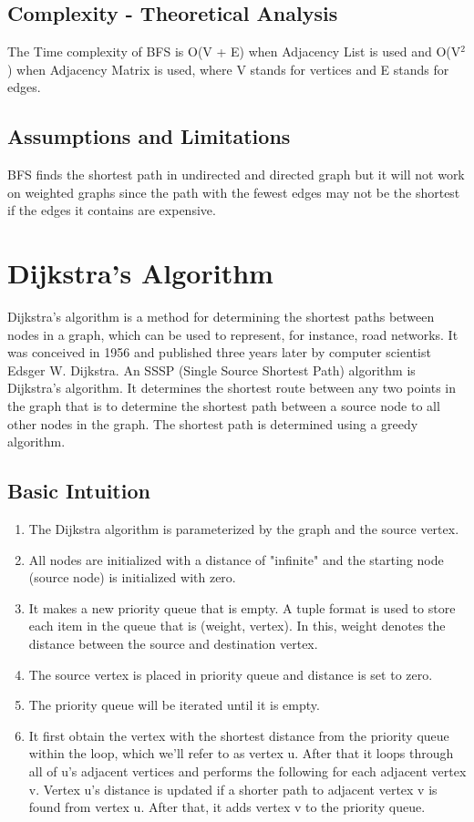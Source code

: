 \documentclass[a4paper, 12pt]{report}
\begin{document}
    \subsection{Complexity - Theoretical Analysis}
    The Time complexity of BFS is O(V + E) when Adjacency List is used and O(V$^2$) when Adjacency Matrix is used, where V stands for vertices and E stands for edges.
    
    \subsection{Assumptions and Limitations}
    BFS finds the shortest path in undirected and directed graph but it will not work on weighted graphs since the path with the fewest edges may not be the shortest if the edges it contains are expensive.
    
    \pagebreak
    \section{Dijkstra's Algorithm} 
	Dijkstra's algorithm is a method for determining the shortest paths between nodes in a graph, which can be used to represent, for instance, road networks. It was conceived in 1956 and published three years later by computer scientist Edsger W. Dijkstra. An SSSP (Single Source Shortest Path) algorithm is Dijkstra's algorithm. It determines the shortest route between any two points in the graph that is to determine the shortest path between a source node to all other nodes in the graph. The shortest path is determined using a greedy algorithm.
	
	\subsection{Basic Intuition}
	\begin{enumerate}
	    \item The Dijkstra algorithm is parameterized by the graph and the source vertex.
	    \item All nodes are initialized with a distance of "infinite" and the starting node (source node) is initialized with zero.
	    \item It makes a new priority queue that is empty. A tuple format is used to store each item in the queue that is (weight, vertex). In this, weight denotes the distance between the source and destination vertex.
	    \item The source vertex is placed in priority queue and distance is set to zero.
	    \item The priority queue will be iterated until it is empty.
	    \item It first obtain the vertex with the shortest distance from the priority queue within the loop, which we'll refer to as vertex u. After that it loops through all of u's adjacent vertices and performs the following for each adjacent vertex v. Vertex u's distance is updated if a shorter path to adjacent vertex v is found from vertex u. After that, it adds vertex v to the priority queue.
	\end{enumerate}
	
\end{document}
